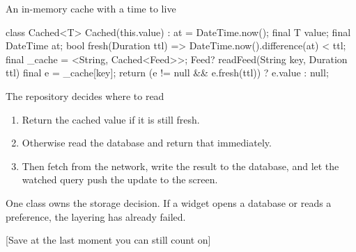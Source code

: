 \documentclass[10pt,aspectratio=169,t]{beamer}
\begin{document}
\begin{frame}[fragile,eyebrow=Storage]{An in-memory cache with a time to live}
\begin{dart}
class Cached<T> {
  Cached(this.value) : at = DateTime.now();
  final T value;
  final DateTime at;
  bool fresh(Duration ttl) => DateTime.now().difference(at) < ttl;
}
final _cache = <String, Cached<Feed>>{};
Feed? readFeed(String key, Duration ttl) {
  final e = _cache[key];
  return (e != null && e.fresh(ttl)) ? e.value : null;
}
\end{dart}
  \vskip 1mm
\end{frame}

\begin{frame}[eyebrow=Storage]{The repository decides where to read}
  \vskip 2mm
  \begin{enumerate}
    \item Return the cached value if it is still fresh. 
    \item Otherwise read the database and return that immediately. 
    \item Then fetch from the network, write the result to the database, and let the watched query push the update to the screen.
  \end{enumerate}
  \vskip 3mm
  \begin{takeaway}{One class owns the storage decision.}
    If a widget opens a database or reads a preference, the layering has already failed.
  \end{takeaway}
\end{frame}

[Save at the last moment you can still count on]
\end{document}
